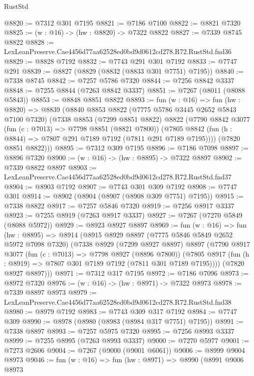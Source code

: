 \begin{lexlean}{RustStd}
\begin{coremodule}
@8820 := @7312 @301 @7195
@8821 := @7186 @7100
@8822 := @8821 @7320
@8825 := (w : @16) -> (hw : @8820) -> @7322 @8822
@8827 := @7339 @8745 @8822
@8828 := LexLeanPreserve.Cae4456d77aa62528ed0bd9d0612cd278.R72.RustStd.fnd36
@8829 := @8828 @7192
@8832 := @7743 @291 @301 @7192
@8833 := @7747 @291
@8839 := @8827 (@8829 (@8832 (@8833 @301 @7751) @7195))
@8840 := @7338 @8745
@8842 := @7257 @5786 @7320
@8844 := @7256 @8842 @3337
@8848 := @7255 @8844 (@7263 @8842 @3337)
@8851 := @7267 (@8011 (@8088 @5843))
@8853 := @8848 @8851 @8822
@8893 := fun (w : @16) =>
  fun (hw : @8820) =>
  @8839
    (@8840
      @8853
      @8822
      (@7775 @5786 @3445 @2652 @5843 @7100 @7320)
      (@7338
        @8853
        (@7299 @8851 @8822)
        @8822
        (@7790
          @8842
          @3077
          (fun (c : @7013) => @7798 @8851 (@8821 @7800))
          (@7805 @8842 (fun (h : @8844) => @7807 @291 @7189 @7192 (@7811 @291 @7189 @7195))))
        (@7820 @8851 @8822)))
@8895 := @7312 @309 @7195
@8896 := @7186 @7098
@8897 := @8896 @7320
@8900 := (w : @16) -> (hw : @8895) -> @7322 @8897
@8902 := @7339 @8822 @8897
@8903 := LexLeanPreserve.Cae4456d77aa62528ed0bd9d0612cd278.R72.RustStd.fnd37
@8904 := @8903 @7192
@8907 := @7743 @301 @309 @7192
@8908 := @7747 @301
@8914 := @8902 (@8904 (@8907 (@8908 @309 @7751) @7195))
@8915 := @7338 @8822
@8917 := @7257 @5846 @7320
@8919 := @7256 @8917 @3337
@8923 := @7255 @8919 (@7263 @8917 @3337)
@8927 := @7267 (@7270 @5849 (@8088 @5972))
@8929 := @8923 @8927 @8897
@8969 := fun (w : @16) =>
  fun (hw : @8895) =>
  @8914
    (@8915
      @8929
      @8897
      (@7775 @5846 @5849 @2652 @5972 @7098 @7320)
      (@7338
        @8929
        (@7299 @8927 @8897)
        @8897
        (@7790
          @8917
          @3077
          (fun (c : @7013) => @7798 @8927 (@8896 @7800))
          (@7805 @8917 (fun (h : @8919) => @7807 @301 @7189 @7192 (@7811 @301 @7189 @7195))))
        (@7820 @8927 @8897)))
@8971 := @7312 @317 @7195
@8972 := @7186 @7096
@8973 := @8972 @7320
@8976 := (w : @16) -> (hw : @8971) -> @7322 @8973
@8978 := @7339 @8897 @8973
@8979 := LexLeanPreserve.Cae4456d77aa62528ed0bd9d0612cd278.R72.RustStd.fnd38
@8980 := @8979 @7192
@8983 := @7743 @309 @317 @7192
@8984 := @7747 @309
@8990 := @8978 (@8980 (@8983 (@8984 @317 @7751) @7195))
@8991 := @7338 @8897
@8993 := @7257 @5975 @7320
@8995 := @7256 @8993 @3337
@8999 := @7255 @8995 (@7263 @8993 @3337)
@9000 := @7270 @5977
@9001 := @7273 @2606
@9004 := @7267 (@9000 (@9001 @6061))
@9006 := @8999 @9004 @8973
@9046 := fun (w : @16) =>
  fun (hw : @8971) =>
  @8990
    (@8991
      @9006
      @8973

\end{coremodule}
\end{lexlean}
